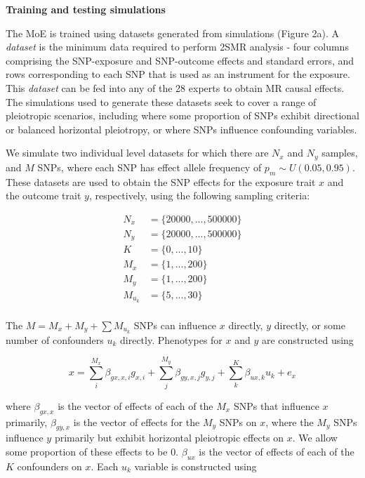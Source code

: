 \documentclass[]{article}
\begin{document}
\textbf{Training and testing simulations}

The MoE is trained using datasets generated from simulations (Figure
2a). A \emph{dataset} is the minimum data required to perform 2SMR
analysis - four columns comprising the SNP-exposure and SNP-outcome
effects and standard errors, and rows corresponding to each SNP that is
used as an instrument for the exposure. This \emph{dataset} can be fed
into any of the 28 experts to obtain MR causal effects. The simulations
used to generate these datasets seek to cover a range of pleiotropic
scenarios, including where some proportion of SNPs exhibit directional
or balanced horizontal pleiotropy, or where SNPs influence confounding
variables.

We simulate two individual level datasets for which there are \(N_x\)
and \(N_y\) samples, and \(M\) SNPs, where each SNP has effect allele
frequency of \(p_m \sim U(0.05, 0.95)\). These datasets are used to
obtain the SNP effects for the exposure trait \(x\) and the outcome
trait \(y\), respectively, using the following sampling criteria:

\[
\begin{aligned}
N_x & = \{20000, ..., 500000\} \\
N_y & = \{20000, ..., 500000\} \\
K & = \{0, ..., 10\} \\
M_x & = \{1, ..., 200\} \\
M_y & = \{1, ..., 200\} \\
M_{u_k} & = \{5,..., 30\} \\
\end{aligned}
\]

The \(M = M_x + M_y + \sum{M_{u_k}}\) SNPs can influence \(x\) directly,
\(y\) directly, or some number of confounders \(u_{k}\) directly.
Phenotypes for \(x\) and \(y\) are constructed using

\[
x = \sum^{M_x}_{i}{\beta_{gx,x,i}g_{x,i}} + \sum^{M_y}_{j}{\beta_{gy,x,j}g_{y,j}} + \sum^{K}_{k}{\beta_{ux,k} u_{k}} + e_{x}
\]

where \(\beta_{gx,x}\) is the vector of effects of each of the \(M_x\)
SNPs that influence \(x\) primarily, \(\beta_{gy,x}\) is the vector of
effects for the \(M_y\) SNPs on \(x\), where the \(M_y\) SNPs influence
\(y\) primarily but exhibit horizontal pleiotropic effects on \(x\). We
allow some proportion of these effects to be 0. \(\beta_{ux}\) is the
vector of effects of each of the \(K\) confounders on \(x\). Each
\(u_{k}\) variable is constructed using
\end{document}
